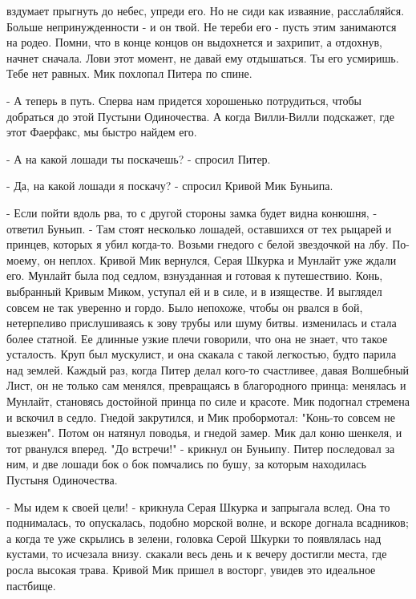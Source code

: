 вздумает прыгнуть до небес, упреди его. Но не сиди как изваяние, 
расслабляйся. Больше непринужденности - и он твой. Не тереби его - 
пусть этим занимаются на родео. Помни, что в конце концов он 
выдохнется и захрипит, а отдохнув, начнет сначала. Лови этот момент, 
не давай ему отдышаться. Ты его усмиришь. Тебе нет равных.
 Мик похлопал Питера по спине.
\par- А теперь в путь. Сперва нам придется хорошенько потрудиться, 
чтобы добраться до этой Пустыни Одиночества. А когда Вилли-Вилли 
подскажет, где этот Фаерфакс, мы быстро найдем его.
\par- А на какой лошади ты поскачешь? - спросил Питер.
\par- Да, на какой лошади я поскачу? - спросил Кривой Мик Буньипа.
\par- Если пойти вдоль рва, то с другой стороны замка будет видна 
конюшня, - ответил Буньип. - Там стоят несколько лошадей, оставшихся 
от тех рыцарей и принцев, которых я убил когда-то. Возьми гнедого с 
белой звездочкой на лбу. По-моему, он неплох.
 Кривой Мик вернулся, Серая Шкурка и Мунлайт уже ждали его. 
Мунлайт была под седлом, взнузданная и готовая к путешествию. Конь, 
выбранный Кривым Миком, уступал ей и в силе, и в изяществе. И выглядел 
совсем не так уверенно и гордо. Было непохоже, чтобы он рвался в бой, 
нетерпеливо прислушиваясь к зову трубы или шуму битвы.
 изменилась и стала более статной. Ее длинные узкие плечи 
говорили, что она не знает, что такое усталость. Круп был мускулист, и 
она скакала с такой легкостью, будто парила над землей. Каждый раз, 
когда Питер делал кого-то счастливее, давая Волшебный Лист, он не 
только сам менялся, превращаясь в благородного принца: менялась и 
Мунлайт, становясь достойной принца по силе и красоте.
 Мик подогнал стремена и вскочил в седло. Гнедой закрутился, 
и Мик пробормотал: "Конь-то совсем не выезжен". Потом он натянул 
поводья, и гнедой замер.
 Мик дал коню шенкеля, и тот рванулся вперед. "До встречи!" 
- крикнул он Буньипу. Питер последовал за ним, и две лошади бок о бок 
помчались по бушу, за которым находилась Пустыня Одиночества.
\par- Мы идем к своей цели! - крикнула Серая Шкурка и запрыгала вслед. 
Она то поднималась, то опускалась, подобно морской волне, и вскоре 
догнала всадников; а когда те уже скрылись в зелени, головка Серой 
Шкурки то появлялась над кустами, то исчезала внизу.
 скакали весь день и к вечеру достигли места, где росла высокая 
трава. Кривой Мик пришел в восторг, увидев это идеальное пастбище.
